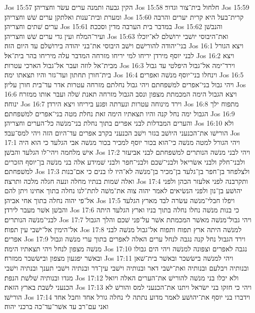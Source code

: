 Jos 15:57  הקין גבעה ותמנה ערים עשׂר וחצריהן׃
Jos 15:58  חלחול בית־צור וגדור׃
Jos 15:59  ומערת ובית־ענות ואלתקן ערים שׁשׁ וחצריהן׃
Jos 15:60  קרית־בעל היא קרית יערים והרבה ערים שׁתים וחצריהן׃
Jos 15:61  במדבר בית הערבה מדין וסככה׃
Jos 15:62  והנבשׁן ועיר־המלח ועין גדי ערים שׁשׁ וחצריהן׃
Jos 15:63  ואת־היבוסי יושׁבי ירושׁלם לא־יוכלו בני־יהודה להורישׁם וישׁב היבוסי את־בני יהודה בירושׁלם עד היום הזה׃
Jos 16:1  ויצא הגורל לבני יוסף מירדן יריחו למי יריחו מזרחה המדבר עלה מיריחו בהר בית־אל׃
Jos 16:2  ויצא מבית־אל לוזה ועבר אל־גבול הארכי עטרות׃
Jos 16:3  וירד־ימה אל־גבול היפלטי עד גבול בית־חורן תחתון ועד־גזר והיו תצאתו ימה׃
Jos 16:4  וינחלו בני־יוסף מנשׁה ואפרים׃
Jos 16:5  ויהי גבול בני־אפרים למשׁפחתם ויהי גבול נחלתם מזרחה עטרות אדר עד־בית חורן עליון׃
Jos 16:6  ויצא הגבול הימה המכמתת מצפון ונסב הגבול מזרחה תאנת שׁלה ועבר אותו ממזרח ינוחה׃
Jos 16:7  וירד מינוחה עטרות ונערתה ופגע ביריחו ויצא הירדן׃
Jos 16:8  מתפוח ילך הגבול ימה נחל קנה והיו תצאתיו הימה זאת נחלת מטה בני־אפרים למשׁפחתם׃
Jos 16:9  והערים המבדלות לבני אפרים בתוך נחלת בני־מנשׁה כל־הערים וחצריהן׃
Jos 16:10  ולא הורישׁו את־הכנעני היושׁב בגזר וישׁב הכנעני בקרב אפרים עד־היום הזה ויהי למס־עבד׃
Jos 17:1  ויהי הגורל למטה מנשׁה כי־הוא בכור יוסף למכיר בכור מנשׁה אבי הגלעד כי הוא היה אישׁ מלחמה ויהי־לו הגלעד והבשׁן׃
Jos 17:2  ויהי לבני מנשׁה הנותרים למשׁפחתם לבני אביעזר ולבני־חלק ולבני אשׂריאל ולבני־שׁכם ולבני־חפר ולבני שׁמידע אלה בני מנשׁה בן־יוסף הזכרים למשׁפחתם׃
Jos 17:3  ולצלפחד בן־חפר בן־גלעד בן־מכיר בן־מנשׁה לא־היו לו בנים כי אם־בנות ואלה שׁמות בנתיו מחלה ונעה חגלה מלכה ותרצה׃
Jos 17:4  ותקרבנה לפני אלעזר הכהן ולפני יהושׁע בן־נון ולפני הנשׂיאים לאמר יהוה צוה את־משׁה לתת־לנו נחלה בתוך אחינו ויתן להם אל־פי יהוה נחלה בתוך אחי אביהן׃
Jos 17:5  ויפלו חבלי־מנשׁה עשׂרה לבד מארץ הגלעד והבשׁן אשׁר מעבר לירדן׃
Jos 17:6  כי בנות מנשׁה נחלו נחלה בתוך בניו וארץ הגלעד היתה לבני־מנשׁה הנותרים׃
Jos 17:7  ויהי גבול־מנשׁה מאשׁר המכמתת אשׁר על־פני שׁכם והלך הגבול אל־הימין אל־ישׁבי עין תפוח׃
Jos 17:8  למנשׁה היתה ארץ תפוח ותפוח אל־גבול מנשׁה לבני אפרים׃
Jos 17:9  וירד הגבול נחל קנה נגבה לנחל ערים האלה לאפרים בתוך ערי מנשׁה וגבול מנשׁה מצפון לנחל ויהי תצאתיו הימה׃
Jos 17:10  נגבה לאפרים וצפונה למנשׁה ויהי הים גבולו ובאשׁר יפגעון מצפון ובישׂשכר ממזרח׃
Jos 17:11  ויהי למנשׁה בישׂשכר ובאשׁר בית־שׁאן ובנותיה ויבלעם ובנותיה ואת־ישׁבי דאר ובנותיה וישׁבי עין־דר ובנתיה וישׁבי תענך ובנתיה וישׁבי מגדו ובנותיה שׁלשׁת הנפת׃
Jos 17:12  ולא יכלו בני מנשׁה להורישׁ את־הערים האלה ויואל הכנעני לשׁבת בארץ הזאת׃
Jos 17:13  ויהי כי חזקו בני ישׂראל ויתנו את־הכנעני למס והורשׁ לא הורישׁו׃
Jos 17:14  וידברו בני יוסף את־יהושׁע לאמר מדוע נתתה לי נחלה גורל אחד וחבל אחד ואני עם־רב עד אשׁר־עד־כה ברכני יהוה׃
